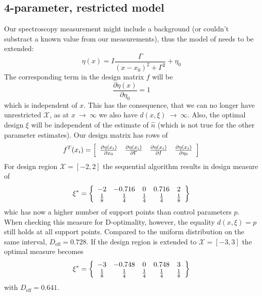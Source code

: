 \documentclass[12pt]{iopart}
\begin{document}
\subsection{4-parameter, restricted model}

Our spectroscopy measurement might include a background (or couldn't substract a known value from our measurements), thus the model of  needs to be extended:
\begin{equation}
\eta(x) = I \frac{\Gamma}{(x - x_0)^2 + \Gamma^2} + \eta_0
\label{eq:lorentz4}
\end{equation}
The corresponding term in the design matrix $f$ will be
\begin{equation}
\frac{\partial \eta(x)}{\partial \eta_0} = 1
\end{equation}
which is independent of $x$. This has the consequence, that we can no longer have unrestricted $\mathcal{X}$, as at $x~\rightarrow~\infty$ we also have $d(x,\xi)~\rightarrow~\infty$. Also, the optimal design $\xi$ will be independent of the estimate of $\hat n$ (which is not true for the other parameter estimates). Our design matrix has rows of
\begin{equation}
 f^T(x_i) = \left[ 
  \begin{array}{l l l l}
   \frac{\partial \eta(x_i)}{\partial x_0} & \frac{\partial \eta(x_i)}{\partial \Gamma} & \frac{\partial \eta(x_i)}{\partial I} & \frac{\partial \eta(x_i)}{\partial \eta_0}
  \end{array} \right ]
\end{equation}
For design region $\mathcal{X} = [-2, 2]$ the sequential algorithm results in design measure of
\begin{equation}
\xi^* = \left\{ 
  \begin{array}{c c c c c}
    -2 & -0.716 & 0 & 0.716 & 2\\
    \frac{1}{8} & \frac{1}{4} & \frac{1}{4} & \frac{1}{4} & \frac{1}{8}\\
  \end{array} \right \}
\end{equation}
whic has now a higher number of support points than control parameters $p$. When checking this measure for D-optimality, however, the equality $d(x, \xi) = p$ still holds at all support points. Compared to the uniform distribution on the same interval, $D_\mathrm{eff} = 0.728$. If the design region is extended to $\mathcal{X} = [-3, 3]$ the optimal measure becomes
\begin{equation}
\xi^* = \left\{ 
  \begin{array}{c c c c c}
    -3 & -0.748 & 0 & 0.748 & 3\\
    \frac{1}{8} & \frac{1}{4} & \frac{1}{4} & \frac{1}{4} & \frac{1}{8}\\
  \end{array} \right \}
\end{equation}
with $D_\mathrm{eff} = 0.641$.
\end{document}
